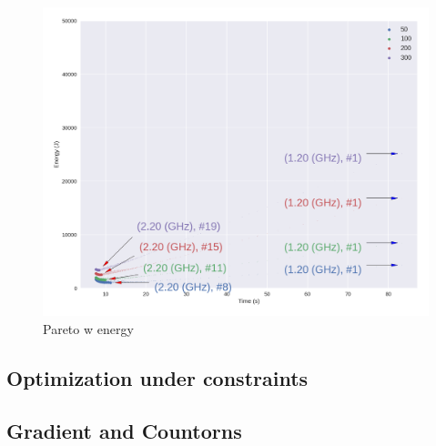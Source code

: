 \begin{figure}

	\centering

	\includegraphics[width=\columnwidth]{models/figures/analisys/pareto_static_low.png}

	\caption{Pareto w energy}

	\label{fig:pareto_w_l}

\end{figure}


\subsection{Optimization under constraints}


\subsection{Gradient and Countorns}


